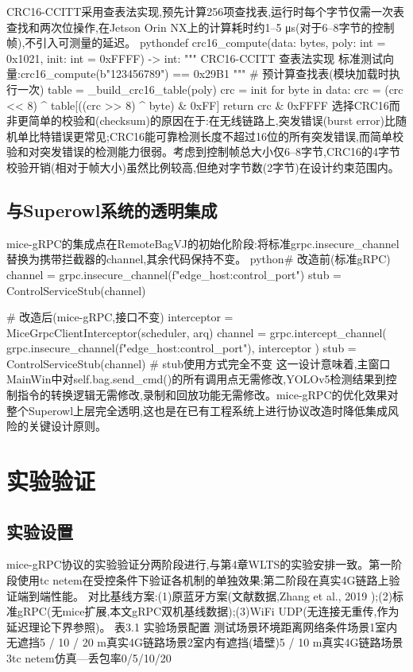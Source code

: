CRC16-CCITT采用查表法实现,预先计算256项查找表,运行时每个字节仅需一次表查找和两次位操作,在Jetson Orin NX上的计算耗时约1–5 μs(对于6–8字节的控制帧),不引入可测量的延迟。
pythondef crc16_compute(data: bytes,
                  poly: int = 0x1021,
                  init: int = 0xFFFF) -> int:
    """
    CRC16-CCITT 查表法实现
    标准测试向量:crc16_compute(b"123456789") == 0x29B1
    """
    # 预计算查找表(模块加载时执行一次)
    table = _build_crc16_table(poly)
    crc = init
    for byte in data:
        crc = (crc << 8) ^ table[((crc >> 8) ^ byte) & 0xFF]
    return crc & 0xFFFF
选择CRC16而非更简单的校验和(checksum)的原因在于:在无线链路上,突发错误(burst error)比随机单比特错误更常见;CRC16能可靠检测长度不超过16位的所有突发错误,而简单校验和对突发错误的检测能力很弱。考虑到控制帧总大小仅6–8字节,CRC16的4字节校验开销(相对于帧大小)虽然比例较高,但绝对字节数(2字节)在设计约束范围内。

\subsection{与Superowl系统的透明集成}

mice-gRPC的集成点在RemoteBagVJ的初始化阶段:将标准grpc.insecure_channel替换为携带拦截器的channel,其余代码保持不变。
python# 改造前(标准gRPC)
channel = grpc.insecure_channel(f"{edge_host}:{control_port}")
stub    = ControlServiceStub(channel)

# 改造后(mice-gRPC,接口不变)
interceptor = MiceGrpcClientInterceptor(scheduler, arq)
channel     = grpc.intercept_channel(
    grpc.insecure_channel(f"{edge_host}:{control_port}"),
    interceptor
)
stub = ControlServiceStub(channel)  # stub使用方式完全不变
这一设计意味着,主窗口MainWin中对self.bag.send_cmd()的所有调用点无需修改,YOLOv5检测结果到控制指令的转换逻辑无需修改,录制和回放功能无需修改。mice-gRPC的优化效果对整个Superowl上层完全透明,这也是在已有工程系统上进行协议改造时降低集成风险的关键设计原则。

\section{实验验证}
\subsection{实验设置}

mice-gRPC协议的实验验证分两阶段进行,与第4章WLTS的实验安排一致。第一阶段使用tc netem在受控条件下验证各机制的单独效果;第二阶段在真实4G链路上验证端到端性能。
对比基线方案:(1)原蓝牙方案(文献数据,Zhang et al., 2019 \cite{zhang2019bci});(2)标准gRPC(无mice扩展,本文gRPC双机基线数据);(3)WiFi UDP(无连接无重传,作为延迟理论下界参照)。
表3.1 实验场景配置
测试场景环境距离网络条件场景1室内无遮挡5 / 10 / 20 m真实4G链路场景2室内有遮挡(墙壁)5 / 10 m真实4G链路场景3tc netem仿真—丢包率0/5/10/20%

